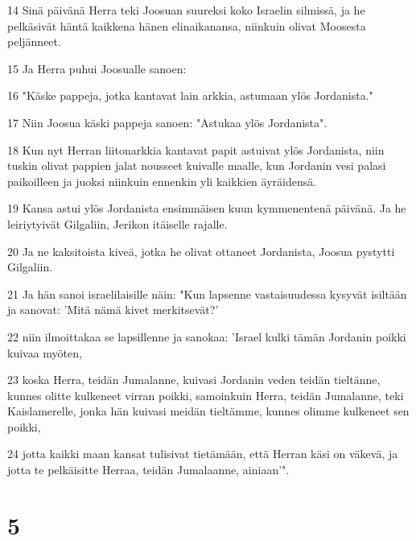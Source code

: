 \par 14 Sinä päivänä Herra teki Joosuan suureksi koko Israelin silmissä, ja he pelkäsivät häntä kaikkena hänen elinaikanansa, niinkuin olivat Moosesta peljänneet.
\par 15 Ja Herra puhui Joosualle sanoen:
\par 16 "Käske pappeja, jotka kantavat lain arkkia, astumaan ylös Jordanista."
\par 17 Niin Joosua käski pappeja sanoen: "Astukaa ylös Jordanista".
\par 18 Kun nyt Herran liitonarkkia kantavat papit astuivat ylös Jordanista, niin tuskin olivat pappien jalat nousseet kuivalle maalle, kun Jordanin vesi palasi paikoilleen ja juoksi niinkuin ennenkin yli kaikkien äyräidensä.
\par 19 Kansa astui ylös Jordanista ensimmäisen kuun kymmenentenä päivänä. Ja he leiriytyivät Gilgaliin, Jerikon itäiselle rajalle.
\par 20 Ja ne kaksitoista kiveä, jotka he olivat ottaneet Jordanista, Joosua pystytti Gilgaliin.
\par 21 Ja hän sanoi israelilaisille näin: "Kun lapsenne vastaisuudessa kysyvät isiltään ja sanovat: 'Mitä nämä kivet merkitsevät?'
\par 22 niin ilmoittakaa se lapsillenne ja sanokaa: 'Israel kulki tämän Jordanin poikki kuivaa myöten,
\par 23 koska Herra, teidän Jumalanne, kuivasi Jordanin veden teidän tieltänne, kunnes olitte kulkeneet virran poikki, samoinkuin Herra, teidän Jumalanne, teki Kaislamerelle, jonka hän kuivasi meidän tieltämme, kunnes olimme kulkeneet sen poikki,
\par 24 jotta kaikki maan kansat tulisivat tietämään, että Herran käsi on väkevä, ja jotta te pelkäisitte Herraa, teidän Jumalaanne, ainiaan'".

\chapter{5}


